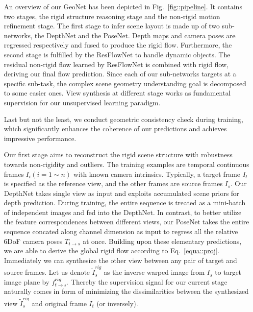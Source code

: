 \documentclass[10pt,twocolumn,letterpaper]{article}
\begin{document}
An overview of our GeoNet has been depicted in Fig.~\ref{fig::pipeline}. It contains two stages, the rigid structure reasoning stage and the non-rigid motion refinement stage. The first stage to infer scene layout is made up of two sub-networks, \ie the DepthNet and the PoseNet. Depth maps and camera poses are regressed respectively and fused to produce the rigid flow. Furthermore, the second stage is fulfilled by the ResFlowNet to handle dynamic objects. The residual non-rigid flow learned by ResFlowNet is combined with rigid flow, deriving our final flow prediction. Since each of our sub-networks targets at a specific sub-task, the complex scene geometry understanding goal is decomposed to some easier ones. View synthesis at different stage works as fundamental supervision for our unsupervised learning paradigm. 

Last but not the least, we conduct geometric consistency check during training, which significantly enhances the coherence of our predictions and achieves impressive performance.


Our first stage aims to reconstruct the rigid scene structure with robustness towards non-rigidity and outliers. The training examples are temporal continuous frames $I_{i} (i=1\sim n)$ with known camera intrinsics. Typically, a target frame $I_t$ is specified as the reference view, and the other frames are source frames $I_s$. Our DepthNet takes single view as input and exploits accumulated scene priors for depth prediction. During training, 
the entire sequence is treated as a mini-batch of independent images and fed into the DepthNet.
In contrast, to better utilize the feature correspondences between different views, our PoseNet takes the entire sequence concated along channel dimension as input to regress all the relative 6DoF camera poses $T_{t\to s}$ at once. Building upon these elementary predictions, we are able to derive the global rigid flow according to Eq.~\eqref{equa::proj}. Immediately we can synthesize the other view between any pair of target and source frames. Let us denote $\tilde{I}_s^{rig}$ as the inverse warped image from $I_s$ to target image plane by $f_{t\to s}^{rig}$. 
Thereby the supervision signal for our current stage naturally comes in form of minimizing the dissimilarities between the synthesized view $\tilde{I}_s^{rig}$ and original frame $I_t$ (or inversely).
\end{document}
